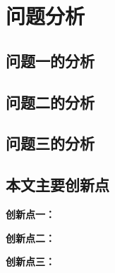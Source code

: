 \section{问题分析}


\subsection{问题一的分析}

\subsection{问题二的分析}

\subsection{问题三的分析}

\subsection{本文主要创新点}

\textbf{创新点一：}

\textbf{创新点二：}

\textbf{创新点三：}
